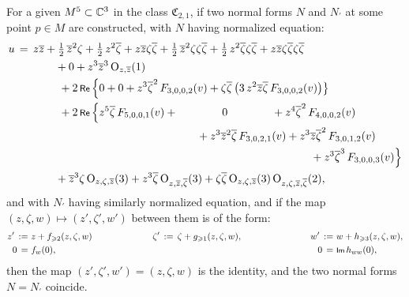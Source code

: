 \documentclass[12pt,twoside,leqno,openany]{amsart}
\begin{document}
\begin{Theorem}
\label{Thm-uniqueness-complete-normal-form-M5-C3}
For a given $M^5 \subset \mathbb{C}^3$ in the class $\mathfrak{C}_{2,1}$,
if two normal forms $N$ and $N_\prime$ 
at some point $p \in M$ are constructed, with $N$ having 
normalized equation:
\[
\aligned
u
&
\,=\,
z\overline{z}
+
\tfrac{1}{2}\,\overline{z}^2\zeta
+
\tfrac{1}{2}\,z^2\overline{\zeta}
+
z\overline{z}\zeta\overline{\zeta}
+
\tfrac{1}{2}\,\overline{z}^2\zeta\zeta\overline{\zeta}
+
\tfrac{1}{2}\,z^2\overline{\zeta}\zeta\overline{\zeta}
+
z\overline{z}\zeta\overline{\zeta}\zeta\overline{\zeta}
\notag
\\
&
\ \ \ \ \ \ \ \ \ \ \ 
+
0
+
z^3\overline{z}^3\,
{\rm O}_{z,\overline{z}}(1)
\notag
\\
&
\ \ \ \ \ \ \ \ \ \ \ \ 
+
2\,\Re\,
\Big\{
0
+
0
+
z^3\overline{\zeta}^2\,
F_{3,0,0,2}(v)
+
\zeta\overline{\zeta}\,
\big(
3\,z^2\overline{z}\overline{\zeta}\,
F_{3,0,0,2}(v)
\big)
\big\}
\notag
\\
&
\ \ \ \ \ \ \ \ \ \ \ \ 
+
2\,\Re\,
\Big\{
z^5\overline{\zeta}\,
F_{5,0,0,1}(v)
+
\ \ \ \ \ \ \ \ \ \ \ \ 
0
\ \ \ \ \ \ \ \ \ \ \ \ 
+
z^4\overline{\zeta}^2\,
F_{4,0,0,2}(v)
\notag
\\
&
\ \ \ \ \ \ \ \ \ \ \ \ \ \ \ \ \ \ \ \ \ \ \ \ \ \ \ \ \ \ \ \ \ \ \ 
\ \ \ \ \ \ \ \ \ \ \ \ \ \ \,
+
z^3\overline{z}^2\overline{\zeta}\,
F_{3,0,2,1}(v)
+
z^3\overline{z}\overline{\zeta}^2\,
F_{3,0,1,2}(v)
\notag
\\
&
\ \ \ \ \ \ \ \ \ \ \ \ \ \ \ \ \ \ \ \ \ \ \ \ \ \ \ \ \ \ \ \ \ \ \
\ \ \ \ \ \ \ \ \ \ \ \ \ \ \ \ \ \ \ \ \ \ \ \ \ \ \ \ \ \ \ \ \ \ \
\ \ \ \ \ \ \ \ \ \ \,
+
z^3\overline{\zeta}^3\,
F_{3,0,0,3}(v)
\Big\}
\notag
\\
&
\ \ \ \ \ \ \ \ \ \ \ 
+
\overline{z}^3\zeta\,
{\rm O}_{z,\zeta,\overline{z}}(3)
+
z^3\overline{\zeta}\,
{\rm O}_{z,\overline{z},\overline{\zeta}}(3)
+
\zeta\overline{\zeta}\,
{\rm O}_{z,\zeta,\overline{z}}(3)\,
{\rm O}_{z,\zeta,\overline{z},\overline{\zeta}}(2),
\endaligned
\]
and with $N_\prime$ having similarly normalized equation,
and if the map $(z, \zeta, w) \longmapsto (z', \zeta', w')$ 
between them is of the form:
\[
\aligned
z'
\,:=\,
&\,
z
+
f_{\geqslant 2}(z,\zeta,w)
\ \ \ \ \ \ \ \ \ \ \ \ \ \ \ \ \ \ \ \
\zeta'
\,:=\,
\zeta
+
g_{\geqslant 1}(z,\zeta,w),
&
\ \ \ \ \ \ \ \ \ \ \ \ \ \ \ \ \ \ \ \
w'
\,:=\,
&\,
w
+
h_{\geqslant 3}(z,\zeta,w),
\\
0
\,=\,
&\,
f_w(0),
&
\ \ \ \ \ \ \ \ \ \ \ \ \ \ \ \ \ \ \ \
0
\,=\,
&\,
\Im\,h_{ww}(0),
\endaligned
\]
then the map $(z',\zeta',w') = (z, \zeta, w)$
is the identity, and the two normal forms 
$N = N_\prime$ coincide.
\end{Theorem}
\end{document}
